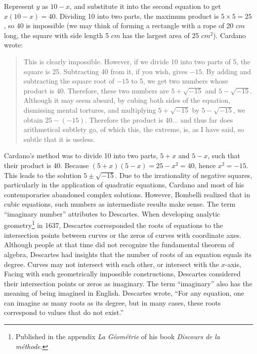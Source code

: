\documentclass[b5paper]{article}
\begin{document}
Represent $y$ as $10 - x$, and substitute it into the second equation to get $x(10 - x) = 40$. Dividing 10 into two parts, the maximum product is $5 \times 5 = 25$, so 40 is impossible (we may think of forming a rectangle with a rope of 20 $cm$ long, the square with side length 5 $cm$ has the largest area of 25 $cm^2$). Cardano wrote:

\begin{quotation}
  This is clearly impossible. However, if we divide 10 into two parts of 5, the square is 25. Subtracting 40 from it, if you wish, gives $-15$. By adding and subtracting the square root of $-15$ to 5, we get two numbers whose product is 40. Therefore, these two numbers are $5 + \sqrt{-15}$ and $5 - \sqrt{-15}$. Although it may seem absurd, by cubing both sides of the equation, dismissing mental tortures, and multiplying $5 + \sqrt{-15}$ by $5 - \sqrt{-15}$, we obtain $25 - (-15)$. Therefore the product is 40... and thus far does arithmetical subtlety go, of which this, the extreme, is, as I have said, so subtle that it is useless.
\end{quotation}

Cardano's method was to divide 10 into two parts, $5 + x$ and $5 - x$, such that their product is 40. Because $(5 + x)(5 - x) = 25 - x^2 = 40$, hence $x^2 = -15$. This leads to the solution $5 \pm \sqrt{-15}$. Due to the irrationality of negative squares, particularly in the application of quadratic equations, Cardano and most of his contemporaries abandoned complex solutions. However, Bombelli realized that in  cubic equations, such numbers as intermediate results make sense. The term \enquote{imaginary number} attributes to Descartes. When developing analytic geometry\footnote{Published in the appendix \emph{La Géométrie} of his book \emph{Discours de la méthode}.} in 1637, Descartes corresponded the roots of equations to the intersection points between curves or the zeros of curves with coordinate axes. Although people at that time did not recognize the fundamental theorem of algebra, Descartes had insights that the number of roots of an equation equals its degree. Curves may not intersect with each other, or intersect with the $x$-axis, Facing with such geometrically impossible constructions, Descartes considered their intersection points or zeros as imaginary. The term \enquote{imaginary} also has the meaning of being imagined in English. Descartes wrote, \enquote{For any equation, one can imagine as many roots as its degree, but in many cases, these roots correspond to values that do not exist.}
\end{document}
